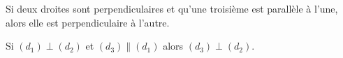 Si deux droites sont perpendiculaires et qu'une troisième est parallèle à l'une,
alors elle est perpendiculaire à l'autre.%
\begin{center}
    Si $(d_1)\perp(d_2)$ et $(d_3)\parallel(d_1)$ alors $(d_3)\perp(d_2)$.
\end{center}